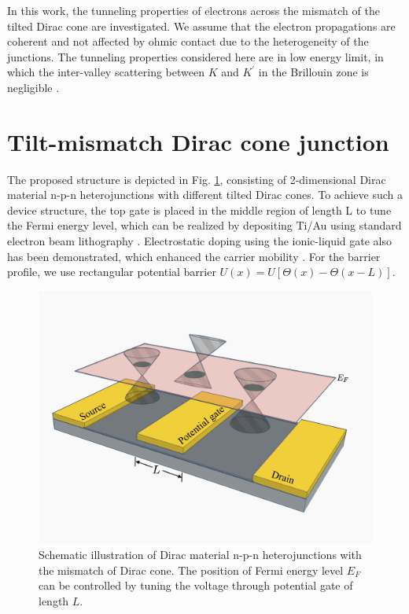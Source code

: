 In this work, the tunneling properties of electrons across the mismatch of the tilted Dirac cone are investigated.
We assume that the electron propagations are coherent and not affected by ohmic contact due to the heterogeneity of the junctions. 
The tunneling properties considered here are in low energy limit, in which the inter-valley scattering between $K$ and $K^\prime$ in the Brillouin zone is negligible \cite{Abergel2009}.
\section{Tilt-mismatch Dirac cone junction}
    The proposed structure is depicted in Fig. \ref{fig:transistor}, consisting of 2-dimensional Dirac material n-p-n heterojunctions with different tilted Dirac cones. 
    To achieve such a device structure, the top gate is placed in the middle region of length L to tune the Fermi energy level, which can be realized by depositing Ti/Au using standard electron beam lithography \cite{Huard2007}.
    Electrostatic doping using the ionic-liquid gate also has been demonstrated, which enhanced the carrier mobility \cite{Perera2013}. 
    For the barrier profile, we use rectangular potential barrier $U(x) = U[\Theta(x)-\Theta(x-L)]$.
    \begin{figure}[H]
        \centering
        \includegraphics[width=0.6\linewidth]{fig/Transistor.png}
        \caption{Schematic illustration of Dirac material n-p-n heterojunctions with the mismatch of Dirac cone. 
                    The position of Fermi energy level $E_F$ can be controlled by tuning the voltage through potential gate of length $L$.}
        \label{fig:transistor}
    \end{figure}

